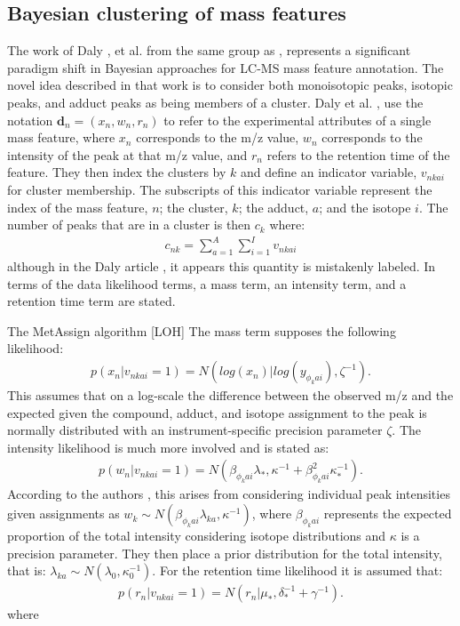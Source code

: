 \begin{DoubleSpace*}
\section{Bayesian clustering of mass features}
The work of Daly \cite{daly2014}, et al. from the same group as \cite{rogers2009}, represents a significant paradigm shift in Bayesian approaches for LC-MS mass feature annotation. The novel idea described in that work is to consider both monoisotopic peaks, isotopic peaks, and adduct peaks as being members of a cluster. Daly et al. \cite{daly2014}, use the notation $\textbf{d}_n = (x_n,w_n,r_n)$ to refer to the experimental attributes of a single mass feature, where $x_n$ corresponds to the m/z value, $w_n$ corresponds to the intensity of the peak at that m/z value, and $r_n$ refers to the retention time of the feature. They then index the clusters by $k$ and define an indicator variable, $v_{nkai}$ for cluster membership. The subscripts of this indicator variable represent the index of the mass feature, $n$; the cluster, $k$; the adduct, $a$; and the isotope $i$. The number of peaks that are in a cluster is then $c_k$ where:
\begin{align}
	c_{nk}=\sum_{a=1}^A \sum_{i=1}^I v_{nkai}
\end{align}
although in the Daly article \cite{daly2014}, it appears this quantity is mistakenly labeled. In terms of the data likelihood terms, a mass term, an intensity term, and a retention time term are stated. 

The MetAssign algorithm [LOH]
The mass term supposes the following likelihood:
\begin{align}
	p(x_n|v_{nkai}=1) = N(log(x_n)|log(y_{\phi_k ai}),\zeta^{-1}). 
\end{align}
This assumes that on a log-scale the difference between the observed m/z and the expected given the compound, adduct, and isotope assignment to the peak is normally distributed with an instrument-specific precision parameter $\zeta$. The intensity likelihood is much more involved and is stated as:  
\begin{align}
	p(w_n|v_{nkai}=1)=N(\beta_{\phi_k ai} \lambda_{*},\kappa^{-1}+\beta^2_{\phi_k ai}\kappa^{-1}_{*}).
\end{align}
According to the authors \cite{daly2014}, this arises from considering individual peak intensities given assignments as $w_k\sim N(\beta_{\phi_k ai} \lambda_{ka},\kappa^{-1})$, where $\beta_{\phi_k ai}$ represents the expected proportion of the total intensity considering isotope distributions and $\kappa$ is a precision parameter. They then place a prior distribution for the total intensity, that is: $\lambda_{k a} \sim N(\lambda_0, \kappa_0^{-1})$. For the retention time likelihood it is assumed that:
\begin{align}
	p(r_n|v_{nkai}=1)=N(r_n|\mu_*,\delta_*^{-1}+\gamma^{-1}).
\end{align}
where 

\end{DoubleSpace*}